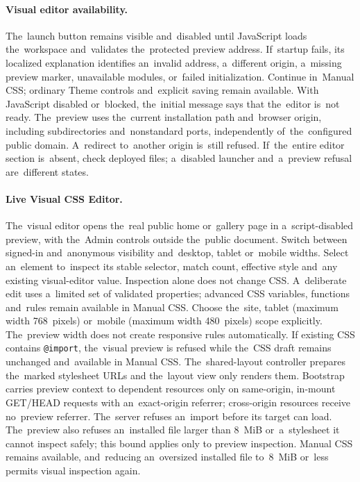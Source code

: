 \documentclass[11pt,a4paper]{article}
\newcommand{\filepath}[1]{\path{#1}}
\newcommand{\codeword}[1]{\nolinkurl{#1}}
\begin{document}
\paragraph{Visual editor availability.} The~launch button remains visible
and~disabled until JavaScript loads the~workspace and~validates the~protected
preview address. If~startup fails, its localized explanation identifies
an~invalid address, a~different origin, a~missing preview marker, unavailable
modules, or~failed initialization. Continue in~Manual CSS; ordinary Theme
controls and~explicit saving remain available. With JavaScript disabled
or~blocked, the~initial message says that the~editor is~not ready. The~preview
uses the~current installation path and~browser origin, including subdirectories
and~nonstandard ports, independently of~the~configured public domain. A~redirect
to~another origin is~still refused. If~the~entire editor section is~absent,
check deployed files; a~disabled launcher and~a~preview refusal are~different
states.

\paragraph{Live Visual CSS Editor.} The~visual editor opens the~real public home
or~gallery page in a~script-disabled preview, with the~Admin controls outside
the~public document. Switch between signed-in and~anonymous visibility
and~desktop, tablet or~mobile widths. Select an~element to~inspect its stable
selector, match count, effective style and~any existing visual-editor value.
Inspection alone does not change CSS. A~deliberate edit uses a~limited set of
validated properties; advanced CSS variables, functions and~rules remain
available in Manual CSS. Choose the~site, tablet (maximum width 768~pixels)
or~mobile (maximum width 480~pixels) scope explicitly. The~preview width does
not create responsive rules automatically. If existing CSS contains
\codeword{@import}, the~visual preview is refused while the~CSS draft remains
unchanged and~available in Manual CSS. The~shared-layout controller prepares
the~marked stylesheet URLs and the~layout view only renders them. Bootstrap
carries preview context to dependent resources only on same-origin, in-mount
GET/HEAD requests with an~exact-origin referrer; cross-origin resources receive
no~preview referrer. The~server refuses an~import before its target can load.
The~preview also refuses an~installed \filepath{public/assets/custom.css} file
larger than 8~MiB or~a~stylesheet it cannot inspect safely; this bound applies
only to preview inspection. Manual CSS remains available, and~reducing
an~oversized installed file to~8~MiB or~less permits visual inspection again.
\end{document}
